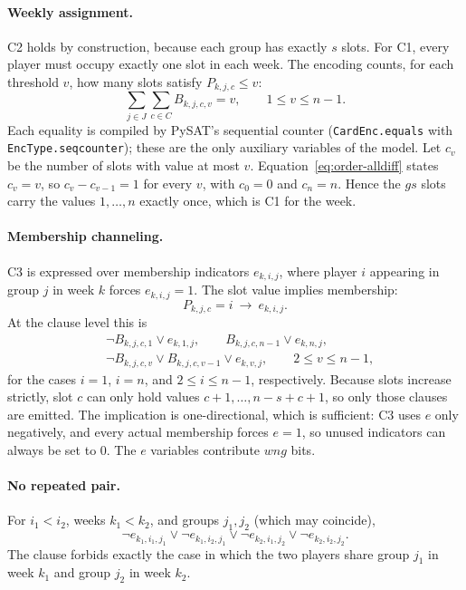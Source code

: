 \documentclass[a4paper,fleqn]{cas-sc}
\begin{document}
\paragraph{Weekly assignment.}
C2 holds by construction, because each group has exactly $s$ slots. For
C1, every player must occupy exactly one slot in each week. The encoding
counts, for each threshold $v$, how many slots satisfy
$P_{k,j,c}\le v$:
\begin{equation}
 \sum_{j\in J}\sum_{c\in C} B_{k,j,c,v} = v,
 \qquad 1\le v\le n-1.
 \label{eq:order-alldiff}
\end{equation}
Each equality is compiled by PySAT's sequential counter
(\texttt{CardEnc.equals} with \texttt{EncType.seqcounter}); these are the
only auxiliary variables of the model. Let $c_v$ be the number of slots
with value at most $v$. Equation~\eqref{eq:order-alldiff} states
$c_v=v$, so $c_v-c_{v-1}=1$ for every $v$, with $c_0=0$ and $c_n=n$.
Hence the $gs$ slots carry the values $1,\ldots,n$ exactly once, which
is C1 for the week.

\paragraph{Membership channeling.}
C3 is expressed over membership indicators $e_{k,i,j}$, where
player $i$ appearing in group $j$ in week $k$ forces $e_{k,i,j}=1$. The
slot value implies membership:
\begin{equation}
 P_{k,j,c}=i\ \longrightarrow\ e_{k,i,j}.
 \label{eq:order-channel}
\end{equation}
At the clause level this is
\begin{align}
 &\neg B_{k,j,c,1}\lor e_{k,1,j}, \qquad
   B_{k,j,c,n-1}\lor e_{k,n,j}, \label{eq:order-channel-ends}\\
 &\neg B_{k,j,c,v}\lor B_{k,j,c,v-1}\lor e_{k,v,j},
   \qquad 2\le v\le n-1, \label{eq:order-channel-mid}
\end{align}
for the cases $i=1$, $i=n$, and $2\le i\le n-1$, respectively.
Because slots increase strictly, slot $c$ can only hold values
$c+1,\ldots,n-s+c+1$, so only those clauses are emitted. The implication
is one-directional, which is sufficient: C3 uses $e$ only negatively,
and every actual membership forces $e=1$, so unused indicators can
always be set to $0$. The $e$ variables contribute $wng$ bits.

\paragraph{No repeated pair.}
For $i_1<i_2$, weeks $k_1<k_2$, and groups $j_1,j_2$ (which may
coincide),
\begin{equation}
 \neg e_{k_1,i_1,j_1}\lor\neg e_{k_1,i_2,j_1}\lor
 \neg e_{k_2,i_1,j_2}\lor\neg e_{k_2,i_2,j_2}.
 \label{eq:order-c3}
\end{equation}
The clause forbids exactly the case in which the two players share group
$j_1$ in week $k_1$ and group $j_2$ in week $k_2$.
\end{document}
